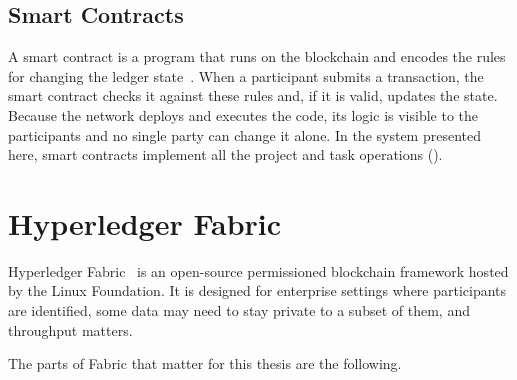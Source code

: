 \subsection{Smart Contracts}
\label{sec:smart-contracts}

A smart contract is a program that runs on the blockchain and encodes the rules for changing the ledger state~\cite{szabo1997}. When a participant submits a transaction, the smart contract checks it against these rules and, if it is valid, updates the state. Because the network deploys and executes the code, its logic is visible to the participants and no single party can change it alone. In the system presented here, smart contracts implement all the project and task operations ().

\section{Hyperledger Fabric}
\label{sec:fabric}

Hyperledger Fabric~\cite{fabric,androulaki2018} is an open-source permissioned blockchain framework hosted by the Linux Foundation. It is designed for enterprise settings where participants are identified, some data may need to stay private to a subset of them, and throughput matters.

The parts of Fabric that matter for this thesis are the following.

